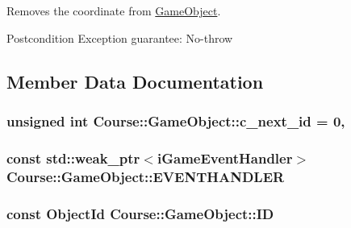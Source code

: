 Removes the coordinate from \hyperlink{classCourse_1_1GameObject}{Game\-Object}. 

\begin{DoxyPostcond}{Postcondition}
Exception guarantee\-: No-\/throw 
\end{DoxyPostcond}


\subsection{Member Data Documentation}
\hypertarget{classCourse_1_1GameObject_a0cc8f333824e69647c4bdbe0fa99a0cf}{
\subsubsection[{c\-\_\-next\-\_\-id}]{\setlength{\rightskip}{0pt plus 5cm}unsigned int Course\-::\-Game\-Object\-::c\-\_\-next\-\_\-id = 0\hspace{0.3cm}{\ttfamily [static]}, {\ttfamily [private]}}}\label{classCourse_1_1GameObject_a0cc8f333824e69647c4bdbe0fa99a0cf}
\hypertarget{classCourse_1_1GameObject_af321898b03674781a97d2d0741522181}{
\subsubsection[{E\-V\-E\-N\-T\-H\-A\-N\-D\-L\-E\-R}]{\setlength{\rightskip}{0pt plus 5cm}const std\-::weak\-\_\-ptr$<${\bf i\-Game\-Event\-Handler}$>$ Course\-::\-Game\-Object\-::\-E\-V\-E\-N\-T\-H\-A\-N\-D\-L\-E\-R\hspace{0.3cm}{\ttfamily [private]}}}\label{classCourse_1_1GameObject_af321898b03674781a97d2d0741522181}
\hypertarget{classCourse_1_1GameObject_a6524f318100ebbaa1571996a2cab18a8}{
\subsubsection[{I\-D}]{\setlength{\rightskip}{0pt plus 5cm}const {\bf Object\-Id} Course\-::\-Game\-Object\-::\-I\-D}}\label{classCourse_1_1GameObject_a6524f318100ebbaa1571996a2cab18a8}


